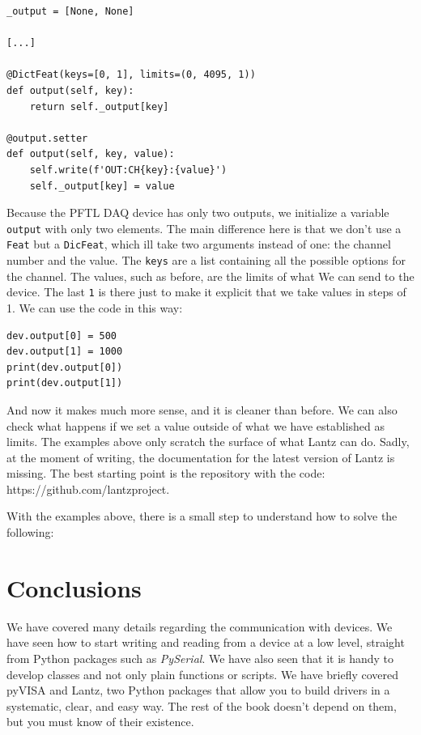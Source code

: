 \begin{verbatim}
_output = [None, None]

[...]

@DictFeat(keys=[0, 1], limits=(0, 4095, 1))
def output(self, key):
    return self._output[key]

@output.setter
def output(self, key, value):
    self.write(f'OUT:CH{key}:{value}')
    self._output[key] = value
\end{verbatim}

Because the {PFTL DAQ} device has only two outputs, we initialize a variable \texttt{output} with only two elements. The main difference here is that we don't use a \texttt{Feat} but a \texttt{DicFeat}, which ill take two arguments instead of one: the channel number and the value. The \texttt{keys} are a list containing all the possible options for the channel. The values, such as before, are the limits of what We can send to the device. The last \texttt{1} is there just to make it explicit that we take values in steps of 1. We can use the code in this way:

\begin{verbatim}
dev.output[0] = 500
dev.output[1] = 1000
print(dev.output[0])
print(dev.output[1])
\end{verbatim}

And now it makes much more sense, and it is cleaner than before. We can also check what happens if we set a value outside of what we have established as limits. The examples above only scratch the surface of what Lantz can do. Sadly, at the moment of writing, the documentation for the latest version of Lantz is missing. The best starting point is the repository with the code: https://github.com/lantzproject.

With the examples above, there is a small step to understand how to solve the following:


\section{Conclusions}\label{sec:conclusions2}
We have covered many details regarding the communication with devices. We have seen how to start writing and reading from a device at a low level, straight from Python packages such as \emph{PySerial}. We have also seen that it is handy to develop classes and not only plain functions or scripts. We have briefly covered pyVISA and Lantz, two Python packages that allow you to build drivers in a systematic, clear, and easy way. The rest of the book doesn't depend on them, but you must know of their existence.

